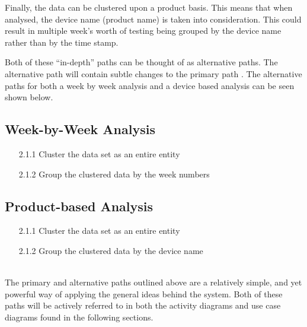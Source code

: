 Finally, the data can be clustered upon a product basis. This means that when 
analysed, the device name (product name) is taken into consideration. This 
could result in multiple week's worth of testing being grouped by the device 
name rather than by the time stamp. 

Both of these ``in-depth'' paths can be thought of as alternative paths. The 
alternative path will contain subtle changes to the primary path 
\citep{lunn03}. The alternative paths for both a week by week analysis and a 
device based analysis can be seen shown below.

\subsection*{Week-by-Week Analysis}
\begin{enumerate}
  \item[2.1.1] Cluster the data set as an entire entity
  \item[2.1.2] Group the clustered data by the week numbers
\end{enumerate}

\subsection*{Product-based Analysis}
\begin{enumerate}
  \item[2.1.1] Cluster the data set as an entire entity
  \item[2.1.2] Group the clustered data by the device name
\end{enumerate}
~\\
The primary and alternative paths outlined above are a relatively simple, and 
yet powerful way of applying the general ideas behind the system. Both of 
these paths will be actively referred to in both the activity diagrams and use 
case diagrams found in the following sections.